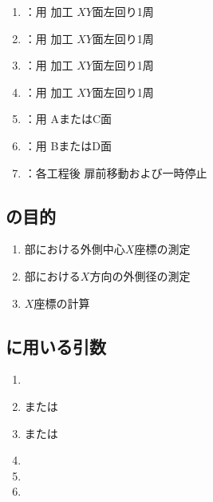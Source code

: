 \begin{enumerate}[label*=\sarrow]
\item \KOLeftFF：\KEndFaceBoring 用 加工 $XY$面左回り1周
\item \KOLeftFS：\KEndFaceRight\KOutcutRLeft\KKeywayConerLeft\KEndFaceOutCChamferRLeft 用 加工 $XY$面左回り1周
\item \KOLeftFSZ：\KCurvedOutcutRLeft\KEndFaceCurvedOutCChamferRLeft 用 加工 $XY$面左回り1周
\item \KILeftFF：\KEndFaceInCChamferRLeft\KIncutBoring 用 加工 $XY$面左回り1周
\item \DKLthreeAC：\DLtwoAC 用 AまたはC面 \DimpleMilling
\item \DKLthreeBD：\DLtwoBD 用 BまたはD面 \DimpleMilling
\item \OpauseCheck：各工程後 扉前移動および一時停止
\end{enumerate}



\clearpage


\subsection{\MXOThickness の目的}
\begin{enumerate}[label*=\sarrow]
\item \EndFace 部における外側中心$X$座標の測定
\item \EndFace 部における$X$方向の外側径の測定
\item \KeywayCenter$X$座標の計算
\end{enumerate}


\subsection{\MXOThickness に用いる引数}
\begin{enumerate}[label*=\sarrow]
\item \PMACOD
\item \PMTopReAlocationLength または\PMBottomReAlocationLength
\item \PMTopAlocationLength または\PMBottomAlocationLength
\item \PMCenterCurvatureRadius
\item \PMKeywayPos
\item \PMKeywayWidth
\end{enumerate}


